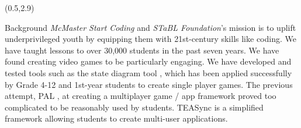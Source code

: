 \documentclass[22pt]{beamer}
\begin{document}
\begin{frame}[fragile]
    \begin{textblock}{7.25}(0.5,2.9)

        \begin{block}{\fontsize{37}{20}\selectfont Background}
            \textit{McMaster Start Coding} and \textit{STaBL Foundation}'s mission is to uplift underprivileged
            youth by equipping them with 21st-century skills like coding. We have taught lessons to over
            30,000 students in the past seven years. We have found creating video games to be particularly
            engaging. We have developed and tested tools such as the state diagram tool
            \cite{pasupathi2022teaching}, which has been applied successfully by Grade 4-12 and 1st-year
            students to create single player games. The previous attempt, PAL \cite{schankula2020newyouthhack}, at creating a
            multiplayer game / app framework proved too complicated to be reasonably used by students. TEASync
            is a simplified framework allowing students to create multi-user applications.
            \vspace{5mm}
        \end{block}


\end{textblock}
\end{frame}
\end{document}
